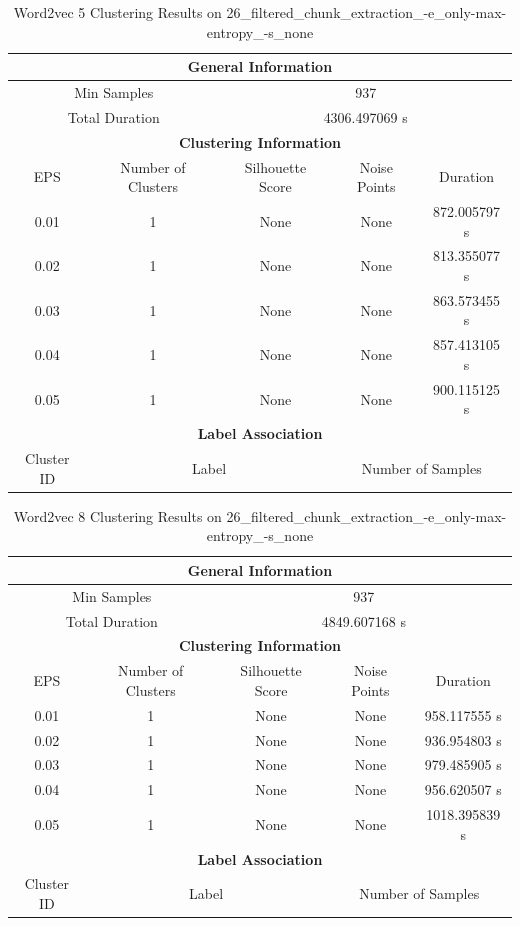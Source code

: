 \begin{longtable}{|c|c|c|c|c|}
\caption{Word2vec 5 Clustering Results on 26\_filtered\_chunk\_extraction\_-e\_only-max-entropy\_-s\_none} \label{tab:26_filtered_chunk_extraction_-e_only-max-entropy_-s_none_word2vec_5_clustering_results}\\
\hline
\multicolumn{5}{|c|}{\textbf{General Information}} \\
\hline
\multicolumn{2}{|c|}{Min Samples} & \multicolumn{3}{c|}{937} \\
\multicolumn{2}{|c|}{Total Duration} & \multicolumn{3}{c|}{4306.497069 s} \\
\hline
\multicolumn{5}{|c|}{\textbf{Clustering Information}} \\
\hline
EPS & Number of Clusters & Silhouette Score & Noise Points & Duration \\
0.01 & 1 & None & None & 872.005797 s\\
0.02 & 1 & None & None & 813.355077 s\\
0.03 & 1 & None & None & 863.573455 s\\
0.04 & 1 & None & None & 857.413105 s\\
0.05 & 1 & None & None & 900.115125 s\\
\hline
\multicolumn{5}{|c|}{\textbf{Label Association}} \\
\hline
Cluster ID & \multicolumn{2}{c|}{Label} & \multicolumn{2}{c|}{Number of Samples} \\
\hline
\end{longtable}


\begin{longtable}{|c|c|c|c|c|}
\caption{Word2vec 8 Clustering Results on 26\_filtered\_chunk\_extraction\_-e\_only-max-entropy\_-s\_none} \label{tab:26_filtered_chunk_extraction_-e_only-max-entropy_-s_none_word2vec_8_clustering_results}\\
\hline
\multicolumn{5}{|c|}{\textbf{General Information}} \\
\hline
\multicolumn{2}{|c|}{Min Samples} & \multicolumn{3}{c|}{937} \\
\multicolumn{2}{|c|}{Total Duration} & \multicolumn{3}{c|}{4849.607168 s} \\
\hline
\multicolumn{5}{|c|}{\textbf{Clustering Information}} \\
\hline
EPS & Number of Clusters & Silhouette Score & Noise Points & Duration \\
0.01 & 1 & None & None & 958.117555 s\\
0.02 & 1 & None & None & 936.954803 s\\
0.03 & 1 & None & None & 979.485905 s\\
0.04 & 1 & None & None & 956.620507 s\\
0.05 & 1 & None & None & 1018.395839 s\\
\hline
\multicolumn{5}{|c|}{\textbf{Label Association}} \\
\hline
Cluster ID & \multicolumn{2}{c|}{Label} & \multicolumn{2}{c|}{Number of Samples} \\
\hline
\end{longtable}


